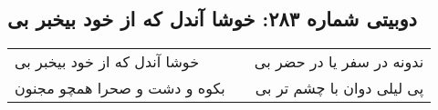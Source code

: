\begin{center}
\section*{دوبیتی شماره ۲۸۳: خوشا آندل که از خود بیخبر بی}
\label{sec:283}
\begin{longtable}{l p{0.5cm} r}
خوشا آندل که از خود بیخبر بی
&&
ندونه در سفر یا در حضر بی
\\
بکوه و دشت و صحرا همچو مجنون
&&
پی لیلی دوان با چشم تر بی
\\
\end{longtable}
\end{center}
